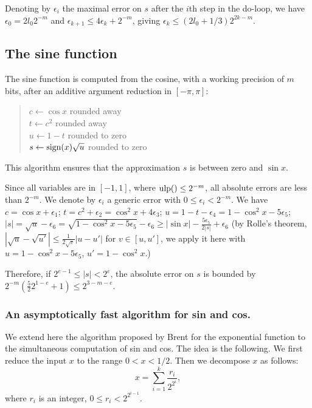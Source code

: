 \documentclass[12pt]{amsart}
\def\ulp{{\rm ulp}}
\begin{document}
Denoting by $\epsilon_i$ the maximal error on $s$ after the $i$th step
in the do-loop, we have $\epsilon_0 = 2 l_0 2^{-m}$ and
$\epsilon_{k+1} \le 4 \epsilon_k + 2^{-m}$,
giving $\epsilon_k \le (2 l_0+1/3) 2^{2k-m}$.

\subsection{The sine function}

The sine function is computed from the cosine, with a working precision of
$m$ bits, after an additive argument reduction in $[-\pi, \pi]$:
\begin{quote}
$c \leftarrow \cos x$ rounded away \\
$t \leftarrow c^2$ rounded away \\
$u \leftarrow 1 - t$ rounded to zero \\
$s \leftarrow {\rm sign}(x) \sqrt{u}$ rounded to zero \\
\end{quote}
This algorithm ensures that the approximation $s$ is between zero and $\sin x$.

Since all variables are in $[-1, 1]$, where $\ulp() \leq 2^{-m}$,
all absolute errors are less than $2^{-m}$.
We denote by $\epsilon_i$ a generic error with $0 \leq \epsilon_i < 2^{-m}$.
We have $c = \cos x + \epsilon_1$;
$t = c^2 + \epsilon_2 = \cos^2 x + 4 \epsilon_3$;
$u = 1 - t - \epsilon_4 = 1 - \cos^2 x - 5 \epsilon_5$;
$|s| = \sqrt{u} - \epsilon_6 =
\sqrt{1 - \cos^2 x - 5 \epsilon_5} - \epsilon_6
\geq |\sin x| - \frac{5 \epsilon_5}{2 |s|} + \epsilon_6$
(by Rolle's theorem,
$|\sqrt{u} - \sqrt{u'}| \le \frac{1}{2 \sqrt{v}} |u-u'|$ for
$v \in [u, u']$, we apply it here with $u=1 - \cos^2 x - 5 \epsilon_5$,
$u'=1 - \cos^2 x$.)

Therefore, if $2^{e-1} \leq |s| < 2^e$, the absolute error on $s$
is bounded by $2^{-m} (\frac{5}{2} 2^{1-e}+1) \leq 2^{3-m-e}$.

\subsubsection{An asymptotically fast algorithm for sin and cos.}
We extend here the algorithm proposed by Brent for the exponential function
to the simultaneous computation of sin and cos. The idea is the following.
We first reduce the input $x$ to the range $0 < x < 1/2$.
Then we decompose $x$ as follows:
\[ x = \sum_{i=1}^{k} \frac{r_i}{2^{2^i}}, \]
where $r_i$ is an integer, $0 \leq r_i < 2^{2^{i-1}}$.
\end{document}
